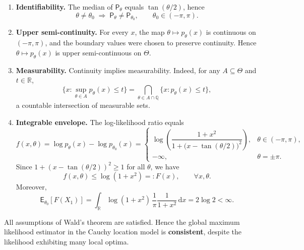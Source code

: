 \begin{ex}
\begin{enumerate}[label=\alph*)]
\item \textbf{Identifiability.}
The median of $\mathsf{P}_\theta$ equals $\tan(\theta/2)$, hence
\begin{equation*}
\theta\neq\theta_0
\;\Longrightarrow\;
\mathsf{P}_\theta\neq\mathsf{P}_{\theta_0},
\qquad \theta_0\in(-\pi,\pi).
\end{equation*}

\item \textbf{Upper semi-continuity.}
For every $x$, the map $\theta\mapsto p_\theta(x)$ is continuous on $(-\pi,\pi)$, and the boundary values were chosen to preserve continuity. Hence $\theta\mapsto p_\theta(x)$ is upper semi-continuous on $\Theta$.

\item \textbf{Measurability.}
Continuity implies measurability. Indeed, for any $A\subseteq\Theta$ and $t\in\mathbb{R}$,
\begin{equation*}
\{x:\sup_{\theta\in A}p_\theta(x)\le t\}
=
\bigcap_{\theta\in A\cap\mathbb{Q}}
\{x:p_\theta(x)\le t\},
\end{equation*}
a countable intersection of measurable sets.

\item \textbf{Integrable envelope.}
The log-likelihood ratio equals
\begin{equation*}
f(x,\theta)
=
\log p_\theta(x)-\log p_{\theta_0}(x)
=
\begin{cases}
\log\!\left(\dfrac{1+x^2}{1+\bigl(x-\tan(\theta/2)\bigr)^2}\right),
& \theta\in(-\pi,\pi),\\[1em]
-\infty,
& \theta=\pm\pi.
\end{cases}
\end{equation*}
Since $1+(x-\tan(\theta/2))^2\ge 1$ for all $\theta$, we have
\begin{equation*}
f(x,\theta)\le \log(1+x^2)=:F(x),
\qquad \forall x,\theta.
\end{equation*}
Moreover,
\begin{equation*}
\mathsf{E}_{\theta_0}[F(X_1)]
=
\int_{\mathbb{R}}
\log(1+x^2)\,
\frac{1}{\pi}\frac{1}{1+x^2}\,\mathrm{d}x
=
2\log 2
<\infty.
\end{equation*}
\end{enumerate}

All assumptions of Wald's theorem are satisfied. Hence the global maximum likelihood estimator in the Cauchy location model is \textbf{consistent}, despite the likelihood exhibiting many local optima.
\end{ex}

